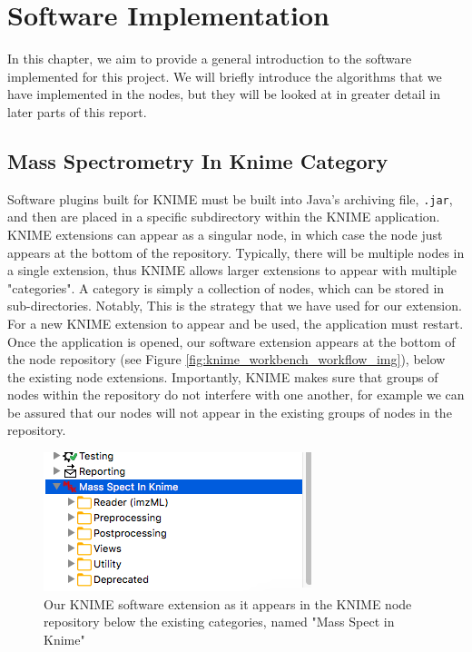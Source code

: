 \documentclass[11pt,openany]{book}
\begin{document}
\chapter{Software Implementation}
\label{chapter:Software_Implementation}
In this chapter, we aim to provide a general introduction to the software implemented for this project. We will briefly introduce the algorithms that we have implemented in the nodes, but they will be looked at in greater detail in later parts of this report. 

\section{Mass Spectrometry In Knime Category}
Software plugins built for KNIME must be built into Java's archiving file, \texttt{.jar}, and then are placed in a specific subdirectory within the KNIME application. KNIME extensions can appear as a singular node, in which case the node just appears at the bottom of the repository. Typically, there will be multiple nodes in a single extension, thus KNIME allows larger extensions to appear with multiple "categories". A category is simply a collection of nodes, which can be stored in sub-directories. Notably,  This is the strategy that we have used for our extension. For a new KNIME extension to appear and be used, the application must restart. Once the application is opened, our software extension appears at the bottom of the node repository (see Figure \ref{fig:knime_workbench_workflow_img}), below the existing node extensions. Importantly, KNIME makes sure that groups of nodes within the repository do not interfere with one another, for example we can be assured that our nodes will not appear in the existing groups of nodes in the repository.

\begin{figure}[H]
    \centering
    \includegraphics[scale=0.5]{./images/MSK_Node_Repository.png}
    \caption{Our KNIME software extension as it appears in the KNIME node repository below the existing categories, named "Mass Spect in Knime"}
    \label{fig:msk_node_repository_viewing}
\end{figure}
\end{document}
